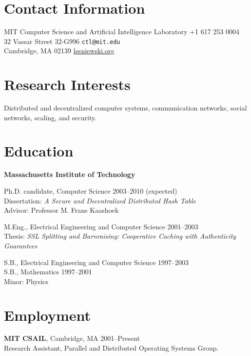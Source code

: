 \documentclass[margin,line,11pt]{resume}
\let\oldsection=\section
\renewcommand{\section}[1]{\oldsection{\small\sc #1}}
\begin{document}

\address{Updated \updated}

\begin{resume}

\section{Contact Information}
MIT Computer Science and Artificial Intelligence Laboratory \hfill +1 617 253 0004      \\
32 Vassar Street 32-G996                                    \hfill \texttt{ctl@mit.edu} \\ 
Cambridge, MA 02139                                         \hfill \href{http://lesniewski.org}{lesniewski.org} \\


\section{Research Interests}
Distributed and decentralized computer systems, communication networks, social
networks, scaling, and security.


\section{Education}

\textbf{Massachusetts Institute of Technology}

Ph.D. candidate, Computer Science \hfill 2003--2010 (expected) \\
Dissertation: \textsl{A Secure and Decentralized Distributed Hash Table} \\
Advisor: Professor M. Frans Kaashoek

M.Eng., Electrical Engineering and Computer Science \hfill 2001--2003 \\
Thesis: \textsl{SSL Splitting and Barnraising: Cooperative Caching with Authenticity Guarantees}

S.B., Electrical Engineering and Computer Science \hfill 1997--2003 \\
S.B., Mathematics \hfill 1997--2001 \\
Minor: Physics


\section{Employment}
\textbf{MIT CSAIL},
Cambridge, MA
\hfill
2001--Present\\
Research Assistant,
Parallel and Distributed Operating Systems Group.


\end{resume}
\end{document}
